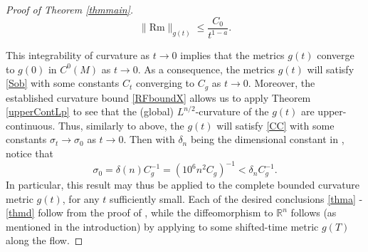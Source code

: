 \documentclass{amsart}
\theoremstyle{definition}
\newcommand{\R}{{\mathbb R}}
\begin{document}
\begin{proof}[Proof of Theorem \ref{thmmain}]
\begin{equation}\label{RFboundX}
\|\mathrm{Rm}\|_{g (t)}\leq \frac{C_0}{t^{1-a}}.
\end{equation}






This integrability of curvature as $t\to 0$ implies that the metrics $g(t)$ converge to $g(0)$ in $C^0(M)$ as $t\to 0$. As a consequence, the metrics $g(t)$ will satisfy \eqref{Sob} with some constants $C_t$ converging to $C_g$ as $t\to 0$. Moreover, the established curvature bound \eqref{RFboundX} allows us to apply Theorem \ref{upperContLp} to see that the (global) $L^{n/2}$-curvature of the $g(t)$ are upper-continuous. Thus, similarly to above, the $g(t)$ will satisfy \eqref{CC} with some constants $\sigma_t\to \sigma_0$ as $t\to 0$.  Then with $\delta_n$ being the dimensional constant in {\cite[Theorem 1.2]{ChauMartens}}, notice that
\[
\sigma_0=\delta(n)C_g^{-1}=(10^6 n^2 C_g)^{-1}< \delta_n C_g^{-1}.
\] 
In particular, this result may thus be applied to the complete bounded curvature metric $g(t)$, for any $t$ sufficiently small. Each of the desired conclusions \ref{thma} - \ref{thmd} follow from the proof of {\cite[Theorem 1.2]{ChauMartens}}, while the diffeomorphism to $\R^n$ follows (as mentioned in the introduction) by applying {\cite[Theorem 1.1]{HuangPeng}} to some shifted-time metric $g(T)$ along the flow. 


\end{proof}
\end{document}
